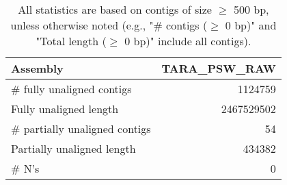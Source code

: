 \documentclass[12pt,a4paper]{article}
\begin{document}
\begin{table}[ht]
\begin{center}
\caption{All statistics are based on contigs of size $\geq$ 500 bp, unless otherwise noted (e.g., "\# contigs ($\geq$ 0 bp)" and "Total length ($\geq$ 0 bp)" include all contigs).}
\begin{tabular}{|l*{1}{|r}|}
\hline
Assembly & TARA\_PSW\_RAW \\ \hline
\# fully unaligned contigs & 1124759 \\ \hline
Fully unaligned length & 2467529502 \\ \hline
\# partially unaligned contigs & 54 \\ \hline
Partially unaligned length & 434382 \\ \hline
\# N's & 0 \\ \hline
\end{tabular}
\end{center}
\end{table}
\end{document}
